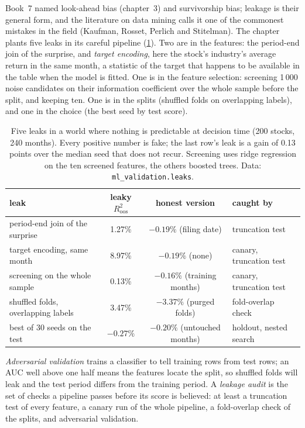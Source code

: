 Book~7 named look-ahead bias (chapter~3) and survivorship bias; leakage is their general form, and the literature on
data mining calls it one of the commonest mistakes in the field (Kaufman, Rosset, Perlich and Stitelman). The chapter
plants five leaks in its careful pipeline (\cref{tab:ml:validation:leaks}). Two are in the features: the period-end join
of the surprise, and \emph{target encoding}, here the stock's industry's average return in the same month, a statistic
of the target that happens to be available in the table when the model is fitted. One is in the feature selection:
screening 1\,000 noise candidates on their information coefficient over the whole sample before the split, and keeping
ten. One is in the splits (shuffled folds on overlapping labels), and one in the choice (the best seed by test score).

\begin{table}[htbp]
\centering\small
\begin{tabular}{@{}lccl@{}}
\toprule
leak & leaky $R^2_{\mathrm{oos}}$ & honest version & caught by\\
\midrule
period-end join of the surprise & 1.27\% & $-0.19\%$ (filing date) & truncation test\\
target encoding, same month & 8.97\% & $-0.19\%$ (none) & canary, truncation test\\
screening on the whole sample & 0.13\% & $-0.16\%$ (training months) & canary, truncation test\\
shuffled folds, overlapping labels & 3.47\% & $-3.37\%$ (purged folds) & fold-overlap check\\
best of 30 seeds on the test & $-0.27\%$ & $-0.20\%$ (untouched months) & holdout, nested search\\
\bottomrule
\end{tabular}
\caption{Five leaks in a world where nothing is predictable at decision time (200 stocks, 240 months). Every positive
number is fake; the last row's leak is a gain of 0.13 points over the median seed that does not recur. Screening uses
ridge regression on the ten screened features, the others boosted trees. Data: \texttt{ml\_validation.leaks}.}\label{tab:ml:validation:leaks}
\end{table}

\begin{definition}\label{def:ml:validation:audit}
\emph{Adversarial validation} trains a classifier to tell training rows from test rows; an
AUC well above one half means the features locate the split, so shuffled folds will leak and the test period differs
from the training period. A \emph{leakage audit} is the set of checks a pipeline passes before its
score is believed: at least a truncation test of every feature, a canary run of the whole pipeline, a fold-overlap
check of the splits, and adversarial validation.
\end{definition}

